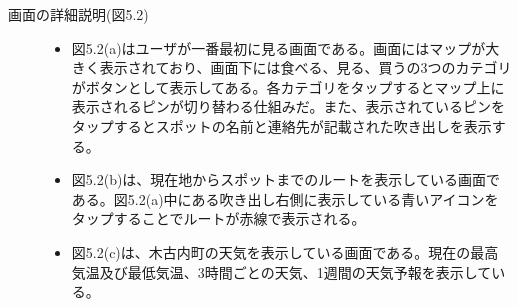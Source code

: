 \begin{description}
\item[画面の詳細説明(図5.2)]\mbox{}
\begin{itemize}
 \item 図5.2(a)はユーザが一番最初に見る画面である。画面にはマップが大きく表示されており、画面下には食べる、見る、買うの3つのカテゴリがボタンとして表示してある。各カテゴリをタップするとマップ上に表示されるピンが切り替わる仕組みだ。また、表示されているピンをタップするとスポットの名前と連絡先が記載された吹き出しを表示する。
 \item 図5.2(b)は、現在地からスポットまでのルートを表示している画面である。図5.2(a)中にある吹き出し右側に表示している青いアイコンをタップすることでルートが赤線で表示される。
 \item 図5.2(c)は、木古内町の天気を表示している画面である。現在の最高気温及び最低気温、3時間ごとの天気、1週間の天気予報を表示している。
\end{itemize}
\end{description}

